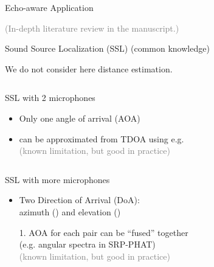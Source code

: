 \begin{frame}[t]{Echo-aware Application \hfill\faBook}
    \begin{center}
        \textcolor{gray}{\small (In-depth literature review in the manuscript.)}
    \end{center}
\end{frame}

\begin{frame}{Sound Source Localization (SSL) {\hfill\small (common knowledge)} \faBook}

    \faAlert We do not consider here distance estimation.

    \begin{columns}[T,onlytextwidth]
        \begin{block}{SSL with 2 microphones}
            \begin{itemize}
                \item Only one angle of arrival (\alert{AOA})\iconAOA
                \item can be approximated from \alert{TDOA} using e.g. \GCCPHAT\footnotemark[1]
                \\\textcolor{gray}{\small (known limitation, but good in practice)}
            \end{itemize}
        \end{block}
    \end{columns}
    \pause

    \begin{columns}[T,onlytextwidth]
        \begin{block}{SSL with more microphones}
            \begin{itemize}
                \item Two Direction of Arrival (DoA):
                \\azimuth (\faArrowsAltH) and elevation (\faArrowsAltV)
                \item[1.] AOA for each pair can be ``fused'' together
                \\(e.g. angular spectra in SRP-PHAT\footnotemark[2])
                \\\textcolor{gray}{\small (known limitation, but good in practice)}
            \end{itemize}
        \end{block}
    \end{columns}


\end{frame}

